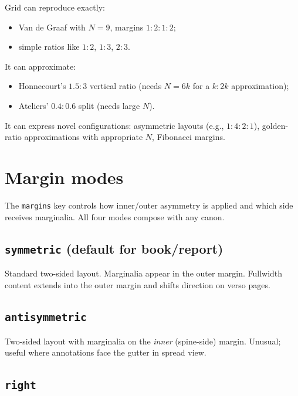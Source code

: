 \documentclass[11pt, twoside, openany]{book}
\begin{document}
Grid can reproduce exactly:

\begin{itemize}
	\item Van de Graaf with $N=9$, margins $1:2:1:2$;
	\item simple ratios like $1:2$, $1:3$, $2:3$.
\end{itemize}

It can approximate:

\begin{itemize}
	\item Honnecourt's $1.5:3$ vertical ratio (needs $N=6k$ for a $k:2k$ approximation);
	\item Ateliers' $0.4:0.6$ split (needs large $N$).
\end{itemize}

It can express novel configurations: asymmetric layouts (e.g., $1:4:2:1$), golden-ratio approximations with appropriate $N$, Fibonacci margins.

\chapter{Margin modes}\label{chapter:marginmodes}

The \texttt{margins} key controls how inner/outer asymmetry is applied and which side receives marginalia. All four modes compose with any canon.

\section{\texttt{symmetric} (default for book/report)}\label{sec:symmetric}

Standard two-sided layout. Marginalia appear in the outer margin. Fullwidth content extends into the outer margin and shifts direction on verso pages.

\section{\texttt{antisymmetric}}\label{sec:antisymmetric}

Two-sided layout with marginalia on the \emph{inner} (spine-side) margin. Unusual; useful where annotations face the gutter in spread view.

\section{\texttt{right}}\label{sec:right}
\end{document}
